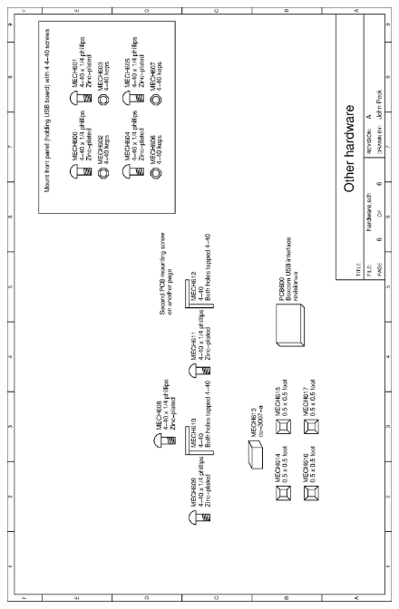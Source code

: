 \begin{figure}[ht]
    \begin{center}
          \vspace{0.4cm}
          \includegraphics[clip,height=\textheight]
          {schematics/usb/hardware}
          \label{sch:hardware}
    \end{center} 
\end{figure}